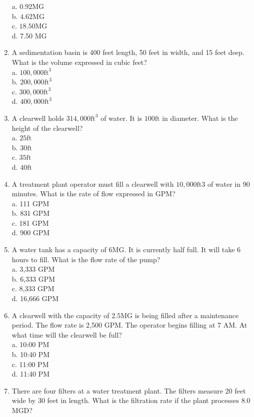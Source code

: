\begin{enumerate}
a. $0.92 \mathrm{MG}$\\
b. $4.62 \mathrm{MG}$\\
c. $18.50 \mathrm{MG}$\\
d. 7.50 MG\\
\item A sedimentation basin is 400 feet length, 50 feet in width, and 15 feet deep. What is the volume expressed in cubic feet?\\
a. $100,000 \mathrm{ft}^{3}$\\
b. $200,000 \mathrm{ft}^{3}$\\
c. $300,000 \mathrm{ft}^{3}$\\
d. $400,000 \mathrm{ft}^{3}$\\
\item A clearwell holds $314,000 \mathrm{ft}^{3}$ of water. It is $100 \mathrm{ft}$ in diameter. What is the height of the clearwell?\\
a. $25 \mathrm{ft}$\\
b. $30 \mathrm{ft}$\\
c. $35 \mathrm{ft}$\\
d. $40 \mathrm{ft}$\\
\item A treatment plant operator must fill a clearwell with $10,000 \mathrm{ft} 3$ of water in 90 minutes. What is the rate of flow expressed in GPM?\\
a. 111 GPM\\
b. 831 GPM\\
c. 181 GPM\\
d. 900 GPM\\
\item A water tank has a capacity of 6MG. It is currently half full. It will take 6 hours to fill. What is the flow rate of the pump?\\
a. 3,333 GPM\\
b. 6,333 GPM\\
c. 8,333 GPM\\
d. 16,666 GPM\\
\item A clearwell with the capacity of $2.5 \mathrm{MG}$ is being filled after a maintenance period. The flow rate is 2,500 GPM. The operator begins filling at 7 AM. At what time will the clearwell be full?\\
a. 10:00 PM\\
b. 10:40 PM\\
c. 11:00 PM\\
d. 11:40 PM\\
\item There are four filters at a water treatment plant. The filters measure 20 feet wide by 30 feet in length. What is the filtration rate if the plant processes 8.0 MGD?\\

\end{enumerate}
